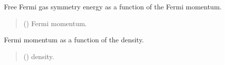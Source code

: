 \documentclass[letterpaper,10pt,english]{sphinxmanual}
\begin{document}

\begin{fulllineitems}
\label{\detokenize{source/api/setup_eos_ffg:nucleardatapy.setup_eos_ffg.esymffg}}
\pysigstartsignatures
\pysiglinewithargsret
{}
{}
{}
\pysigstopsignatures
\sphinxAtStartPar
Free Fermi gas symmetry energy as a function of the Fermi momentum.
\begin{quote}\begin{description}
\sphinxAtStartPar
{} () \textendash{} Fermi momentum.

\end{description}\end{quote}

\end{fulllineitems}


\begin{fulllineitems}
\label{\detokenize{source/api/setup_eos_ffg:nucleardatapy.setup_eos_ffg.kf}}
\pysigstartsignatures
\pysiglinewithargsret
{}
{}
{}
\pysigstopsignatures
\sphinxAtStartPar
Fermi momentum as a function of the density.
\begin{quote}\begin{description}
\sphinxAtStartPar
{} () \textendash{} density.

\end{description}\end{quote}

\end{fulllineitems}
\end{document}
